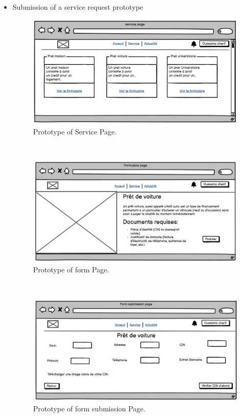 \begin{itemize}
    \item Submission of a service request prototype
\begin{figure}[h!]
    \centering
    \includegraphics[width=1\textwidth]{figures/service page.JPG} 
    \caption{Prototype of Service Page.}
\end{figure}\

\begin{figure}[h]
    \centering
    \includegraphics[width=1\textwidth]{figures/formulaire page.JPG}
    \caption{Prototype of form Page.}
\end{figure}\

\begin{figure}[h]
    \centering
    \includegraphics[width=1\textwidth]{figures/form sub page.JPG} 
    \caption{Prototype of form submission Page.}
\end{figure}\
\end{itemize}
